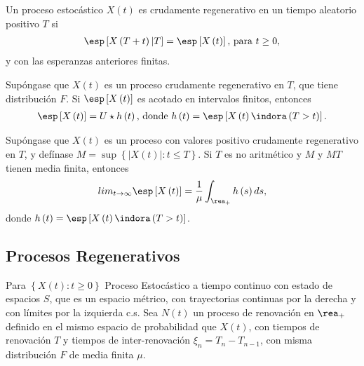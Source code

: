 \begin{Def}
Un proceso estoc\'astico $X\left(t\right)$ es crudamente regenerativo en un tiempo aleatorio positivo $T$ si
\begin{eqnarray*}
\esp\left[X\left(T+t\right)|T\right]=\esp\left[X\left(t\right)\right]\textrm{, para }t\geq0,\end{eqnarray*}
y con las esperanzas anteriores finitas.
\end{Def}

\begin{Prop}
Sup\'ongase que $X\left(t\right)$ es un proceso crudamente regenerativo en $T$, que tiene distribuci\'on $F$. Si $\esp\left[X\left(t\right)\right]$ es acotado en intervalos finitos, entonces
\begin{eqnarray*}
\esp\left[X\left(t\right)\right]=U\star h\left(t\right)\textrm{,  donde }h\left(t\right)=\esp\left[X\left(t\right)\indora\left(T>t\right)\right].
\end{eqnarray*}
\end{Prop}

\begin{Teo}
Sup\'ongase que $X\left(t\right)$ es un proceso con valores positivo crudamente regenerativo en $T$, y def\'inase $M=\sup\left\{|X\left(t\right)|:t\leq T\right\}$. Si $T$ es no aritm\'etico y $M$ y $MT$ tienen media finita, entonces
\begin{eqnarray*}
lim_{t\rightarrow\infty}\esp\left[X\left(t\right)\right]=\frac{1}{\mu}\int_{\rea_{+}}h\left(s\right)ds,
\end{eqnarray*}
donde $h\left(t\right)=\esp\left[X\left(t\right)\indora\left(T>t\right)\right]$.
\end{Teo}

\subsection{Procesos Regenerativos}

Para $\left\{X\left(t\right):t\geq0\right\}$ Proceso Estoc\'astico a tiempo continuo con estado de espacios $S$, que es un espacio m\'etrico, con trayectorias continuas por la derecha y con l\'imites por la izquierda c.s. Sea $N\left(t\right)$ un proceso de renovaci\'on en $\rea_{+}$ definido en el mismo espacio de probabilidad que $X\left(t\right)$, con tiempos de renovaci\'on $T$ y tiempos de inter-renovaci\'on $\xi_{n}=T_{n}-T_{n-1}$, con misma distribuci\'on $F$ de media finita $\mu$.



